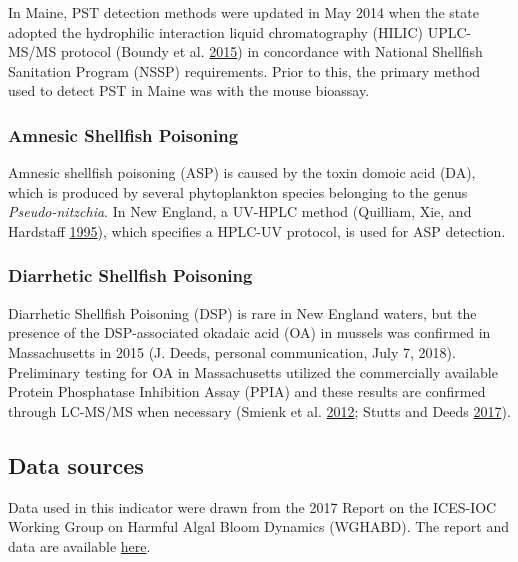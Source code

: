 \documentclass[
]{book}
\begin{document}
In Maine, PST detection methods were updated in May 2014 when the state adopted the hydrophilic interaction liquid chromatography (HILIC) UPLC-MS/MS protocol (Boundy et al. \protect\hyperlink{ref-Boundy2015}{2015}) in concordance with National Shellfish Sanitation Program (NSSP) requirements. Prior to this, the primary method used to detect PST in Maine was with the mouse bioassay.

\hypertarget{amnesic-shellfish-poisoning}{%
\subsubsection{Amnesic Shellfish Poisoning}\label{amnesic-shellfish-poisoning}}

Amnesic shellfish poisoning (ASP) is caused by the toxin domoic acid (DA), which is produced by several phytoplankton species belonging to the genus \emph{Pseudo-nitzchia}. In New England, a UV-HPLC method (Quilliam, Xie, and Hardstaff \protect\hyperlink{ref-Quilliam1995}{1995}), which specifies a HPLC-UV protocol, is used for ASP detection.

\hypertarget{diarrhetic-shellfish-poisoning}{%
\subsubsection{Diarrhetic Shellfish Poisoning}\label{diarrhetic-shellfish-poisoning}}

Diarrhetic Shellfish Poisoning (DSP) is rare in New England waters, but the presence of the DSP-associated okadaic acid (OA) in mussels was confirmed in Massachusetts in 2015 (J. Deeds, personal communication, July 7, 2018). Preliminary testing for OA in Massachusetts utilized the commercially available Protein Phosphatase Inhibition Assay (PPIA) and these results are confirmed through LC-MS/MS when necessary (Smienk et al. \protect\hyperlink{ref-Smienk2012}{2012}; Stutts and Deeds \protect\hyperlink{ref-Stutts2017}{2017}).

\hypertarget{data-sources-24}{%
\subsection{Data sources}\label{data-sources-24}}

Data used in this indicator were drawn from the 2017 Report on the ICES-IOC Working Group on Harmful Algal Bloom Dynamics (WGHABD). The report and data are available \href{http://www.ices.dk/sites/pub/Publication\%20Reports/Expert\%20Group\%20Report/SSGEPD/2017/01\%20WGHABD\%20-\%20Report\%20of\%20the\%20ICES\%20-\%20IOC\%20Working\%20Group\%20on\%20Harmful\%20Algal\%20Bloom\%20Dynamics.pdf}{here}.
\end{document}
